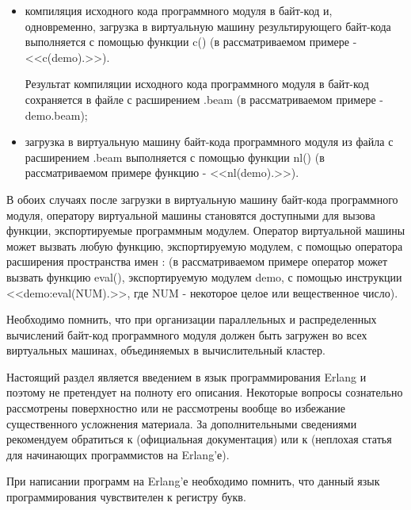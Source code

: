 \begin{itemize}
	\begin{itemize}

		\item компиляция исходного кода программного модуля в байт-код и, одновременно, загрузка в виртуальную машину результирующего байт-кода выполняется с помощью функции c() (в рассматриваемом примере - <<c(demo).>>).

		Результат компиляции исходного кода программного модуля в байт-код сохраняется в файле с расширением .beam (в рассматриваемом примере - demo.beam);

		\item загрузка в виртуальную машину байт-кода программного модуля из файла с расширением .beam выполняется с помощью функции nl() (в рассматриваемом примере функцию - <<nl(demo).>>).

	\end{itemize}

	В обоих случаях после загрузки в виртуальную машину байт-кода программного модуля, оператору виртуальной машины становятся доступными для вызова функции, экспортируемые программным модулем. Оператор виртуальной машины может вызвать любую функцию, экспортируемую модулем, с помощью оператора расширения пространства имен : (в рассматриваемом примере оператор может вызвать функцию eval(), экспортируемую модулем demo, с помощью инструкции <<demo:eval(NUM).>>, где NUM - некоторое целое или вещественное число).

	Необходимо помнить, что при организации параллельных и распределенных вычислений байт-код программного модуля должен быть загружен во всех виртуальных машинах, объединяемых в вычислительный кластер.

\end{itemize}


Настоящий раздел является введением в язык программирования Erlang и поэтому не претендует на полноту его описания. Некоторые вопросы сознательно рассмотрены поверхностно или не рассмотрены вообще во избежание существенного усложнения материала. За дополнительными сведениями рекомендуем обратиться к \cite{erlang-doc} (официальная документация) или к \cite{erlang-rsdn} (неплохая статья для начинающих программистов на Erlang'е).

При написании программ на Erlang'е необходимо помнить, что данный язык программирования чувствителен к регистру букв.


